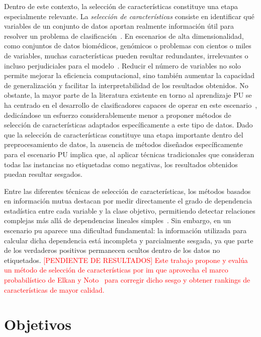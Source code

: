 Dentro de este contexto, la selección de características constituye una etapa especialmente relevante. La \textit{selección de características} consiste en identificar qué variables de un conjunto de datos aportan realmente información útil para resolver un problema de clasificación~\cite{guyon2003introduction}. En escenarios de alta dimensionalidad, como conjuntos de datos biomédicos, genómicos o problemas con cientos o miles de variables, muchas características pueden resultar redundantes, irrelevantes o incluso perjudiciales para el modelo~\cite{saeys2007review}. Reducir el número de variables no solo permite mejorar la eficiencia computacional, sino también aumentar la capacidad de generalización y facilitar la interpretabilidad de los resultados obtenidos. No obstante, la mayor parte de la literatura existente en torno al aprendizaje PU se ha centrado en el desarrollo de clasificadores capaces de operar en este escenario~\cite{bekker2020learning, elkan2008learning}, dedicándose un esfuerzo considerablemente menor a proponer métodos de selección de características adaptados específicamente a este tipo de datos. Dado que la selección de características constituye una etapa importante dentro del preprocesamiento de datos, la ausencia de métodos diseñados específicamente para el escenario PU implica que, al aplicar técnicas tradicionales que consideran todas las instancias no etiquetadas como negativas, los resultados obtenidos puedan resultar sesgados.


Entre las diferentes técnicas de selección de características, los métodos basados en información mutua destacan por medir directamente el grado de dependencia estadística entre cada variable y la clase objetivo, permitiendo detectar relaciones complejas más allá de dependencias lineales simples~\cite{peng2005feature, cover2006elements}. Sin embargo, en un escenario \acrshort{pu} aparece una dificultad fundamental: la información utilizada para calcular dicha dependencia está incompleta y parcialmente sesgada, ya que parte de los verdaderos positivos permanecen ocultos dentro de los datos no etiquetados.
\textcolor{red}{[PENDIENTE DE RESULTADOS] Este trabajo propone y evalúa un método de selección de características por \acrshort{im} que aprovecha el marco probabilístico de Elkan y Noto~\cite{elkan2008learning} para corregir dicho sesgo y obtener rankings de características de mayor calidad.}

\section{Objetivos}
\label{sec:objetivos}

